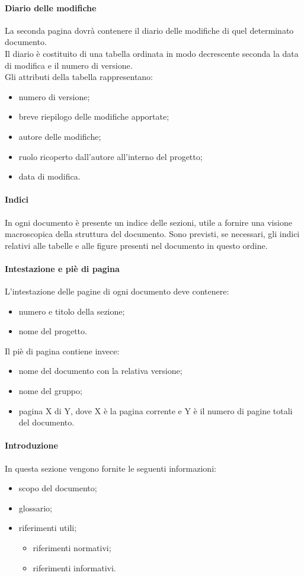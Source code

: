  \paragraph{Diario delle modifiche}
 La seconda pagina dovrà contenere il diario delle modifiche di quel determinato documento.\\
 Il diario è costituito di una tabella ordinata in modo decrescente seconda la data di modifica e il numero di versione.\\
 Gli attributi della tabella rappresentano:
 \begin{itemize}
 	\item numero di versione;
 	\item breve riepilogo delle modifiche apportate;
 	\item autore delle modifiche;
 	\item ruolo ricoperto dall'autore all'interno del progetto;
 	\item data di modifica.
 \end{itemize}
 \paragraph{Indici}
 In ogni documento è presente un indice delle sezioni, utile a fornire una visione macroscopica della struttura del documento. Sono previsti, se necessari, gli indici relativi alle tabelle e alle figure presenti nel documento in questo ordine.
 
 \paragraph{Intestazione e piè di pagina}
L'intestazione delle pagine di ogni documento deve contenere:
\begin{itemize}
	\item numero e titolo della sezione;
	\item nome del progetto.
\end{itemize}
Il piè di pagina contiene invece:
\begin{itemize}
	\item nome del documento con la relativa versione;
	\item nome del gruppo;
	\item pagina X di Y, dove X è la pagina corrente e Y è il numero di pagine totali del documento.
\end{itemize}
\paragraph{Introduzione}
In questa sezione vengono fornite le seguenti informazioni: 
\begin{itemize}
	\item scopo del documento;
	\item glossario;
	\item riferimenti utili;
	\begin{itemize}
		\item riferimenti normativi;
		\item riferimenti informativi.
	\end{itemize}
\end{itemize}
